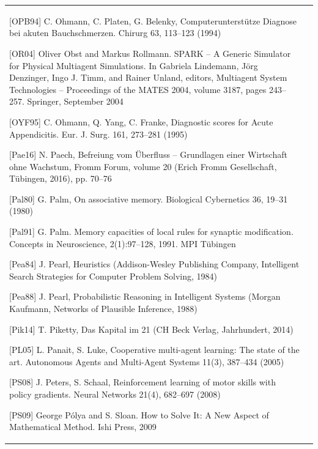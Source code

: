 \documentclass[10pt]{book}
\begin{document}
\begin{tabular}{|l|l|}
[OPB94] C. Ohmann, C. Platen, G. Belenky, Computerunterstütze Diagnose bei akuten Bauchschmerzen. Chirurg 63, 113–123 (1994)

[OR04] Oliver Obst and Markus Rollmann. SPARK – A Generic Simulator for Physical Multiagent Simulations. In Gabriela Lindemann, Jörg Denzinger, Ingo J. Timm, and Rainer Unland, editors, Multiagent System Technologies – Proceedings of the MATES 2004, volume 3187, pages 243–257. Springer, September 2004

[OYF95] C. Ohmann, Q. Yang, C. Franke, Diagnostic scores for Acute Appendicitis. Eur. J. Surg. 161, 273–281 (1995)

[Pae16] N. Paech, Befreiung vom Überfluss – Grundlagen einer Wirtschaft ohne Wachstum, Fromm Forum, volume 20 (Erich Fromm Gesellschaft, Tübingen, 2016), pp. 70–76

[Pal80] G. Palm, On associative memory. Biological Cybernetics 36, 19–31 (1980)

[Pal91] G. Palm. Memory capacities of local rules for synaptic modification. Concepts in Neuroscience, 2(1):97–128, 1991. MPI Tübingen

[Pea84] J. Pearl, Heuristics (Addison-Wesley Publishing Company, Intelligent Search Strategies for Computer Problem Solving, 1984)

[Pea88] J. Pearl, Probabilistic Reasoning in Intelligent Systems (Morgan Kaufmann, Networks of Plausible Inference, 1988)

[Pik14] T. Piketty, Das Kapital im 21 (CH Beck Verlag, Jahrhundert, 2014)

[PL05] L. Panait, S. Luke, Cooperative multi-agent learning: The state of the art. Autonomous Agents and Multi-Agent Systems 11(3), 387–434 (2005)

[PS08] J. Peters, S. Schaal, Reinforcement learning of motor skills with policy gradients. Neural Networks 21(4), 682–697 (2008)

[PS09] George Pólya and S. Sloan. How to Solve It: A New Aspect of Mathematical Method. Ishi Press, 2009


\end{tabular}
\end{document}
